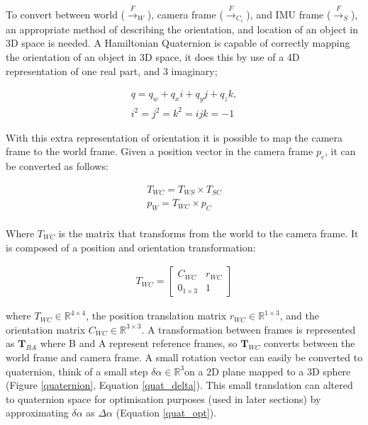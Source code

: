 \documentclass[a4paper,11pt,notitlepage]{article}
\begin{document}
To convert between world (${\xrightarrow{F}}_{W}$), camera frame (${\xrightarrow{F}}_{C_{i}}$), and IMU frame (${\xrightarrow{F}}_{S}$), an appropriate method of describing the orientation, and location of an object in 3D space is needed. A Hamiltonian Quaternion is capable of correctly mapping the orientation of an object in 3D space, it does this by use of a 4D representation of one real part, and 3 imaginary;  

\begin{equation}
\begin{aligned}
\label{quaternion}
q = q_{w} + q_{x}i + q_{y}j+q_{z}k, \\
i^{2}=j^{2}=k^{2}=ijk=-1
\end{aligned}
\end{equation}

With this extra representation of orientation it is possible to map the camera frame to the world frame. Given a position vector in the camera frame $p_{c}$, it can be converted as follows:


\begin{equation}
\begin{aligned}
T_{WC} = T_{WS} \times T_{SC} \\
p_{W} = T_{WC} \times p_{C} \\
\end{aligned}
\end{equation}

Where $T_{WC}$ is the matrix that transforms from the world to the camera frame. It is composed of a position and orientation transformation:

\begin{equation}
\begin{aligned}
T_{WC} = 
\begin{bmatrix}
C_{WC} & r_{WC} \\
0_{1 \times 3} & 1
\end{bmatrix}
\end{aligned}
\end{equation}

where $T_{WC} \in \mathbb{R}^{4 \times 4}$, the position translation matrix $r_{WC} \in \mathbb{R}^{1 \times 3}$, and the orientation matrix $C_{WC} \in \mathbb{R}^{3 \times 3}$. A transformation between frames is represented as $\textbf{T}_{BA}$ where B and A represent reference frames, so $\textbf{T}_{WC}$ converts between the world frame and camera frame. A small rotation vector can easily be converted to quaternion, think of a small step $\delta \alpha \in \mathbb{R}^{3}$on a 2D plane mapped to a 3D sphere (Figure \ref{quaternion}, Equation \ref{quat_delta}). This small translation can altered to quaternion space for optimisation purposes (used in later sections) by approximating $\delta \alpha$ as $\Delta \alpha$ (Equation \ref{quat_opt}).
\end{document}
